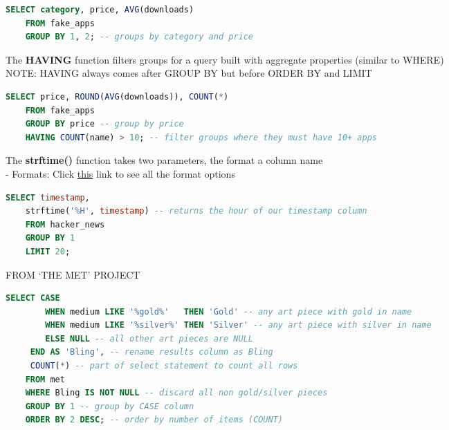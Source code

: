 \documentclass[11pt, a4paper]{article}
\begin{document}
\begin{spacing}{1.1}
\begin{lstlisting}[language=SQL]
	SELECT category, price, AVG(downloads)
	FROM fake_apps
	GROUP BY 1, 2; -- groups by category and price \end{lstlisting} \vspace*{1mm}
	The \textbf{HAVING} function filters groups for a query built with aggregate properties (similar to WHERE)\\
	NOTE: HAVING always comes after GROUP BY but before ORDER BY and LIMIT
	\begin{lstlisting}[language=SQL]
	SELECT price, ROUND(AVG(downloads)), COUNT(*)
	FROM fake_apps
	GROUP BY price -- group by price
	HAVING COUNT(name) > 10; -- filter groups where they must have 10+ apps \end{lstlisting} \vspace*{1mm}
	The \textbf{strftime()} function takes two parameters, the format a column name \\
	\hspace*{3mm} - Formats: Click \href{https://www.sqlite.org/lang_datefunc.html}{this} link to see all the format options
	\begin{lstlisting}[language=SQL]
	SELECT timestamp,
	strftime('%H', timestamp) -- returns the hour of our timestamp column
	FROM hacker_news
	GROUP BY 1
	LIMIT 20; \end{lstlisting} \vspace*{1mm}
	FROM `THE MET' PROJECT
	\begin{lstlisting}[language=SQL]
	SELECT CASE
		WHEN medium LIKE '%gold%'   THEN 'Gold' -- any art piece with gold in name
		WHEN medium LIKE '%silver%' THEN 'Silver' -- any art piece with silver in name
		ELSE NULL -- all other art pieces are NULL
	 END AS 'Bling', -- rename results column as Bling
	 COUNT(*) -- part of select statement to count all rows
	FROM met
	WHERE Bling IS NOT NULL -- discard all non gold/silver pieces
	GROUP BY 1 -- group by CASE column
	ORDER BY 2 DESC; -- order by number of items (COUNT) \end{lstlisting} \newpage

\end{spacing}
\end{document}
